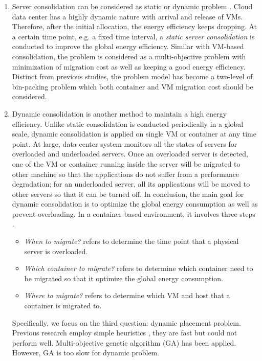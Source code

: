 \begin{enumerate}
\item Server consolidation can be considered as static or dynamic problem \cite{Xiao:2015ik}.
Cloud data center has a highly dynamic nature with arrival and release of VMs. Therefore, 
after the initial allocation, the energy efficiency keeps dropping.  At a certain time point, e.g. a fixed time interval, a \emph{static server consolidation} is conducted to improve the global energy efficiency. Similar with VM-based consolidation, the problem is considered as a multi-objective problem with minimization of migration cost as well as keeping a good energy efficiency. Distinct from previous studies, the problem model has become a two-level of bin-packing problem which both container and VM migration cost should be considered.  
\item Dynamic consolidation is another method to maintain a high energy efficiency. Unlike static consolidation is conducted periodically in a global scale, dynamic consolidation is applied on single VM or container at any time point.  At large, data center system monitors all the states of servers for overloaded and underloaded servers. Once an overloaded server is detected, one of the VM or container running inside the server will be migrated to other machine so that the applications do not suffer from a performance degradation; for an underloaded server, all its applications will be moved to other servers so that it can be turned off. In conclusion, the main goal for dynamic consolidation is to optimize the global energy consumption as well as prevent overloading.
In a container-based environment, it involves three steps . 
	\begin{itemize}
		\item \emph{When to migrate?} refers to determine the time point that a physical server is overloaded. 
		\item \emph{Which container to migrate?} refers to determine which container need to be migrated so that it optimize the global energy consumption.
		\item \emph{Where to migrate?} refers to determine which VM and host that a container is migrated to.  
	\end{itemize}
	Specifically, we focus on the third question: dynamic placement problem. Previous research employ simple heuristics \cite{Shi:2011ke, Forsman:2015ca, Beloglazov:2012ji}, they are fast but could not perform well. Multi-objective genetic algorithm (GA) \cite{Xu:2010vh} has been applied. However, GA is too slow for dynamic problem. 


\end{enumerate}
